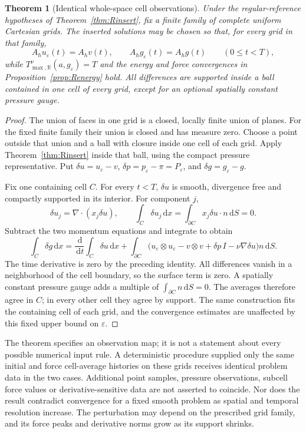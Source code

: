 \documentclass[11pt,a4paper]{article}
\newtheorem{theorem}{Theorem}[section]
\theoremstyle{definition}\newtheorem{definition}[theorem]{Definition}
\theoremstyle{remark}\newtheorem{remark}[theorem]{Remark}
\newcommand{\R}{\mathbb R}\newcommand{\TT}{\mathbb T^3}
\newcommand{\dd}{\,\mathrm d}\newcommand{\eps}{\varepsilon}
\begin{document}
\begin{theorem}[Identical whole-space cell observations]\label{thm:Rgrid}
Under the regular-reference hypotheses of Theorem~\ref{thm:Rinsert}, fix a finite family of complete uniform Cartesian grids. The inserted solutions may be chosen so that, for every grid in that family,
\[
 A_hu_\eps(t)=A_hv(t),\qquad A_hg_\eps(t)=A_hg(t)
 \qquad(0\le t<T),
\]
while $T^\nu_{\max,\R}(a,g_\eps)=T$ and the energy and force convergences in Proposition~\ref{prop:Renergy} hold. All differences are supported inside a ball contained in one cell of every grid, except for an optional spatially constant pressure gauge.
\end{theorem}
\begin{proof}
The union of faces in one grid is a closed, locally finite union of planes. For the fixed finite family their union is closed and has measure zero. Choose a point outside that union and a ball with closure inside one cell of each grid. Apply Theorem~\ref{thm:Rinsert} inside that ball, using the compact pressure representative. Put $\delta u=u_\eps-v$, $\delta p=p_\eps-\pi=P_\eps$, and $\delta g=g_\eps-g$.

Fix one containing cell $C$. For every $t<T$, $\delta u$ is smooth, divergence free and compactly supported in its interior. For component $j$,
\[
 \delta u_j=\nabla\cdot(x_j\delta u),\qquad
 \int_C\delta u_j\dd x=\int_{\partial C}x_j\delta u\cdot n\dd S=0.
\]
Subtract the two momentum equations and integrate to obtain
\begin{equation}\label{eq:gridforce}
 \int_C\delta g\dd x
 =\frac{\dd}{\dd t}\int_C\delta u\dd x
 +\int_{\partial C}\bigl(u_\eps\otimes u_\eps-v\otimes v
                         +\delta p\,I-\nu\nabla\delta u\bigr)n\dd S.
\end{equation}
The time derivative is zero by the preceding identity. All differences vanish in a neighborhood of the cell boundary, so the surface term is zero. A spatially constant pressure gauge adds a multiple of $\int_{\partial C}n\dd S=0$. The averages therefore agree in $C$; in every other cell they agree by support. The same construction fits the containing cell of each grid, and the convergence estimates are unaffected by this fixed upper bound on $\eps$.
\end{proof}

The theorem specifies an observation map; it is not a statement about every possible numerical input rule. A deterministic procedure supplied only the same initial and force cell-average histories on these grids receives identical problem data in the two cases. Additional point samples, pressure observations, subcell force values or derivative-sensitive data are not asserted to coincide. Nor does the result contradict convergence for a fixed smooth problem as spatial and temporal resolution increase. The perturbation may depend on the prescribed grid family, and its force peaks and derivative norms grow as its support shrinks.
\end{document}

